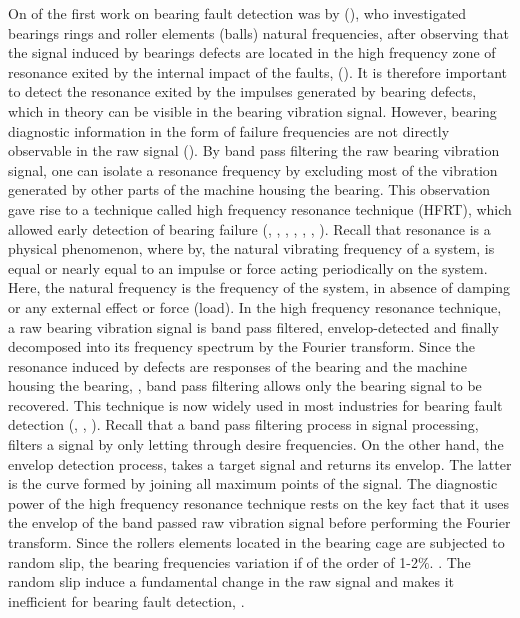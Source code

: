 \documentclass[../Main/thesis.tex]{subfiles}
\begin{document}
\justify
On of the first work on bearing fault detection was by (\cite{balderston1969}), who investigated bearings rings and roller elements (balls) natural frequencies, after observing that the signal induced by bearings defects are located in the high frequency zone of resonance exited by the internal impact of the faults, (\cite{randal2010}). It is therefore important to detect the resonance exited by the impulses generated by bearing defects, which in theory can be visible in the bearing vibration signal. However, bearing diagnostic information in the form of failure frequencies are not directly observable in the raw signal (\cite{randal2010}). By band pass filtering the raw bearing vibration signal, one can isolate a resonance frequency by excluding most of the vibration generated by other parts of the machine housing the bearing. This observation gave rise to a technique called high frequency resonance technique (HFRT), which allowed early detection of bearing failure (\cite{broderick1972}, \cite{burchill1973}, \cite{burchill1973b}, \cite{darlow1975}, \cite{darlow1975}, \cite{darlow1975b}, \cite{board1975}). Recall that resonance is a physical phenomenon, where by, the natural vibrating frequency of a system, is equal or nearly equal to an impulse or force acting periodically on the system. Here, the natural frequency is the frequency of the system, in absence of damping or any external effect or force (load).
\justify
In the high frequency resonance technique, a raw bearing vibration signal is  band pass filtered, envelop-detected and finally decomposed into its frequency spectrum by the Fourier transform. Since the resonance induced by defects are responses of the bearing and the machine housing the bearing, \cite{mcfadden1984}, band pass filtering allows only the bearing signal to be recovered. This technique is now widely used in most industries for bearing fault detection (\cite{gupta2016}, \cite{khadersab2018}, \cite{randal2010}). Recall that a band pass filtering process in signal processing, filters a signal by only letting through desire frequencies. On the other hand, the envelop detection process, takes a target signal and returns its envelop. The latter is the curve formed by joining all maximum points of the signal.
\justify
The diagnostic power of the high frequency resonance technique rests on the key fact that it uses the envelop of the band passed raw vibration signal before performing the Fourier transform. Since the rollers elements located in the bearing cage are subjected to random slip, the bearing frequencies variation if of the order of 1-2$\%$. \cite{randal2010}. The random slip induce a fundamental change in the raw signal and makes it inefficient for bearing fault detection, \cite{randal2010}. 
\end{document}
